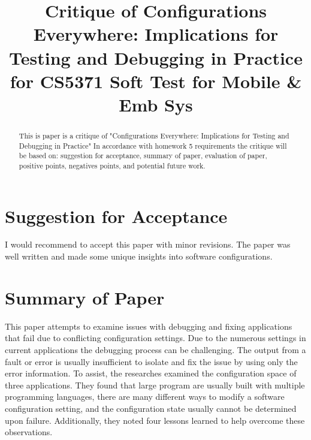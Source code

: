 \documentclass[conference]{IEEEtran}
\begin{document}
\title{Critique of Configurations Everywhere: Implications for Testing and Debugging in Practice\\
for CS5371 Soft Test for Mobile \& Emb Sys}

\author{
}

\maketitle

\begin{abstract}
This is paper is a critique of "Configurations Everywhere: Implications for Testing and Debugging in Practice" In accordance with homework 5 requirements the critique will be based on: suggestion for acceptance, summary of paper, evaluation of paper, positive points, negatives points, and potential future work. 
\end{abstract}

\IEEEpeerreviewmaketitle

\section{Suggestion for Acceptance}
I would recommend to accept this paper with minor revisions. The paper was well written and made some unique insights into software configurations. 

\section{Summary of Paper}
This paper attempts to examine issues with debugging and fixing applications that fail due to conflicting configuration settings. Due to the numerous settings in current applications the debugging process can be challenging. The output from a fault or error is usually insufficient to isolate and fix the issue by using only the error information. To assist, the researches examined the configuration space of three applications. They found that large program are usually built with multiple programming languages, there are many different ways to modify a software configuration setting, and the configuration state usually cannot be determined upon failure. Additionally, they noted four lessons learned to help overcome these observations. 
\end{document}
